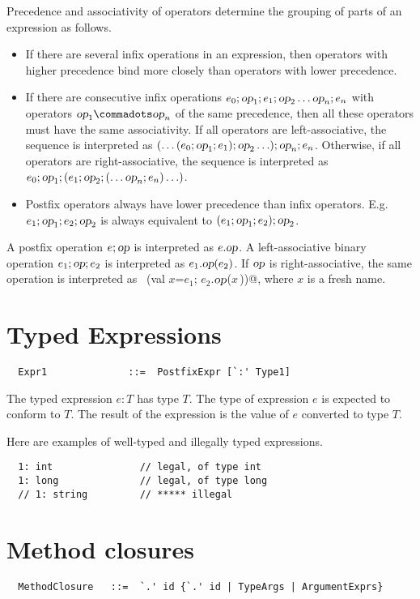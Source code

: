 Precedence and associativity of operators determine the grouping of
parts of an expression as follows.
\begin{itemize}
\item If there are several infix operations in an
expression, then operators with higher precedence bind more closely
than operators with lower precedence.
\item If there are consecutive infix
operations $e_0; \mbox{\sl op}_1; e_1; \mbox{\sl op}_2 \ldots \mbox{\sl op}_n; e_n$ 
with operators $\op_1 \commadots \op_n$ of the same precedence, 
then all these operators must
have the same associativity. If all operators are left-associative,
the sequence is interpreted as
$(\ldots(e_0;\mbox{\sl op}_1;e_1);\mbox{\sl op}_2\ldots);\mbox{\sl op}_n;e_n$. 
Otherwise, if all operators are right-associative, the
sequence is interpreted as
$e_0;\mbox{\sl op}_1;(e_1;\mbox{\sl op}_2;(\ldots \mbox{\sl op}_n;e_n)\ldots)$.
\item
Postfix operators always have lower precedence than infix
operators. E.g.\ $e_1;\mbox{\sl op}_1;e_2;\mbox{\sl op}_2$ is always equivalent to
$(e_1;\mbox{\sl op}_1;e_2);\mbox{\sl op}_2$.
\end{itemize}
A postfix operation $e;\mbox{\sl op}$ is interpreted as $e.\mbox{\sl op}$. A
left-associative binary operation $e_1;\mbox{\sl op};e_2$ is interpreted as
$e_1.\mbox{\sl op}(e_2)$. If $\mbox{\sl op}$ is right-associative, the same operation is
interpreted as ~\lstinline@(val $x$=$e_1$; $e_2$.$\mbox{\sl op}$($x\,$))@, 
where $x$ is a fresh name.

\section{Typed Expressions}

\syntax\begin{lstlisting}
  Expr1              ::=  PostfixExpr [`:' Type1]
\end{lstlisting}

The typed expression $e: T$ has type $T$. The type of
expression $e$ is expected to conform to $T$. The result of
the expression is the value of $e$ converted to type $T$.

\example Here are examples of well-typed and illegally typed expressions.

\begin{lstlisting}
  1: int               // legal, of type int
  1: long              // legal, of type long
  // 1: string         // ***** illegal
\end{lstlisting}

\section{Method closures}
\syntax\begin{lstlisting}
  MethodClosure   ::=  `.' id {`.' id | TypeArgs | ArgumentExprs}
\end{lstlisting}

